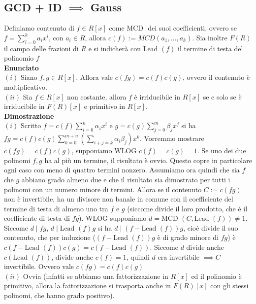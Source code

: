 \documentclass[a4paper,GeneralMath,NoNotes]{stdmdoc}
\newcommand{\Enunciato}{\vskip 0.05cm \noindent \textbf{Enunciato} \\ }
\renewcommand{\Dimostrazione}{\vskip 0.05cm \noindent \textbf{Dimostrazione} \\ }
\newcommand{\MCD}{\text{MCD }}
\newcommand{\Lead}{\text{Lead }}
\begin{document}
	\subsection{GCD + ID $\implies$ Gauss}
	Definiamo contenuto di $f \in R[x]$ come $\MCD$ dei suoi coefficienti, ovvero se $f = \sum_{i=0}^{k} a_i x^i$, con $a_i \in R$, allora $c(f) := MCD(a_1, \ldots, a_k)$. Sia inoltre $F(R)$ il campo delle frazioni di $R$ e si indicherà con $\Lead(f)$ il termine di testa del polinomio $f$ \\
	\Enunciato
		$(i)$ Siano $f, g \in R[x]$. Allora vale $c(fg) = c(f) c(g)$, ovvero il contenuto è moltiplicativo. \\
		$(ii)$ Sia $f \in R[x]$ non costante, allora $f$ è irriducibile in $R[x]$ se e solo se è irriducibile in $F(R)[x]$ e primitivo in $R[x]$. \\
	\Dimostrazione
		$(i)$ Scritto $f = c(f) \sum_{i=0}^{n} \alpha_i x^i$ e $g = c(g) \sum_{j=0}^{m} \beta_j x^j$ si ha $fg = c(f) c(g) \sum_{k = 0}^{m+n} ( \sum_{i + j = k} \alpha_i \beta_j ) x^k$. Vorremmo mostrare $c(fg) = c(f)c(g)$, supponiamo WLOG $c(f) = c(g) = 1$. Se uno dei due polinomi $f, g$ ha al più un termine, il risultato è ovvio. Questo copre in particolare ogni caso con meno di quattro termini nonzero. Assumiamo ora quindi che sia $f$ che $g$ abbiano grado almeno due e che il risultato sia dimostrato per tutti i polinomi con un numero minore di termini. Allora se il contenuto $C := c(fg)$ non è invertibile, ha un divisore non banale in comune con il coefficiente del termine di testa di almeno uno tra $f$ e $g$ (siccome divide il loro prodotto, che è il coefficiente di testa di $fg$). WLOG supponiamo $d = \MCD(C,\Lead(f)) \neq 1$. Siccome $d \mid fg$, $d \mid \Lead(f)g$ si ha $d \mid (f - \Lead(f))g$, cioè divide il suo contenuto, che per induzione ($(f - \Lead(f))g$ è di grado minore di $fg$) è $c(f - \Lead(f))c(g) = c(f - \Lead(f))$. Siccome $d$ divide anche $c(\Lead(f))$, divide anche $c(f) = 1$, quindi $d$ era invertibile $\implies C$ invertibile. Ovvero vale $c(fg) = c(f)c(g)$ \\
		$(ii)$ \frsx Ovvia (infatti se abbiamo una fattorizzazione in $R[x]$ ed il polinomio è primitivo, allora la fattorizzazione si trasporta anche in $F(R)[x]$ con gli stessi polinomi, che hanno grado positivo). \\
\end{document}
